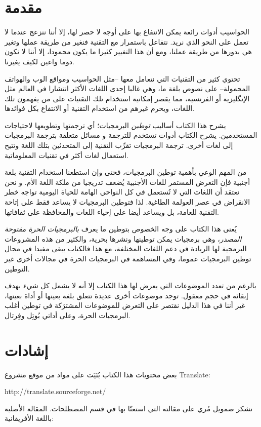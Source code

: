 \section{مقدمة}
الحواسيب أدوات رائعة يمكن الانتفاع بها على أوجه لا حصر لها، إلا أننا
ننزعج عندما لا تعمل على النحو الذي نريد. نتفاعل باستمرار مع التقنية
فنغير من طريقة عملها وتغير هي بدورها من طريقة عملنا، ومع أن هذا التغيير
كثيرا ما يكون محمودا، إلا أننا لا نكون دوما واعين لكيف يغيرنا.

تحتوي كثير من التقنيات التي نتعامل معها –مثل الحواسيب ومواقع الوب
والهواتف المحمولة– على نصوص بلغة ما، وهي غالبا إحدى اللغات الأكثر
انتشارا في العالم مثل الإنگليزية أو الفرنسية، مما يقصر إمكانية استخدام
تلك التقنيات على من يفهمون تلك اللغات، ويحرم غيرهم من استخدام التقنية
أو الانتفاع بكل فوائدها.

يشرح هذا الكتاب أساليب {\it توطين} البرمجيات؛ أي ترجمتها وتطويعها
لاحتياجات المستخدمين. يشرح الكتاب أدوات تستخدم للترجمة و مسائل متعلقة
بترجمة البرمجيات إلى لغات أخرى. ترجمة البرمجيات تقرِّب التقنية إلى
المتحدثين بتلك اللغة وتتيح استعمال لغات أكثر في تقنيات المعلوماتية.

من المهم الوعي بأهمية توطين البرمجيات، فحتى وإن استطعنا استخدام التقنية
بلغة أجنبية فإن التعرض المستمر للغات الأجنبية يُضعف تدريجيا من ملكة
اللغة الأم. و نحن نعتقد أن اللغات التي لا تُستعمل في كل النواحي الهامة
للحياة اليومية تواجه خطر الانقراض في عصر العولمة الطاغية. لذا فتوطين
البرمجيات لا يساعد فقط على إتاحة التقنية للعامة، بل ويساعد أيضا على
إحياء اللغات والمحافظة على ثقافاتها.

يُعنى هذا الكتاب على وجه الخصوص بتوطين ما يعرف {\it بالبرمجيات الحرة
مفتوحة المصدر}، وهي برمجيات يمكن توطينها ونشرها بحرية، والكثير من هذه
المشروعات البرمجية لها الريادة في دعم اللغات المختلفة، مع هذا فالكتاب
يبقى مفيدا في مجال توطين البرمجيات عموما، وفي المساهمة في البرمجيات
الحرة في مجالات أخرى غير التوطين.

بالرغم من تعدد الموضوعات التي يعرض لها هذا الكتاب إلا أنه لا يشمل كل شيء
بهدف إبقائه في حجم معقول. توجد موضوعات أخرى عديدة تتعلق بلغة بعينها أو
أداة بعينها، غير أننا في هذا الدليل نقتصر على التعرض للموضوعات
المشترَكة في توطين أغلب البرمجيات الحرة، وعلى أداتي بُوتِل وفِرتال.

\section{إشادات}
بعض محتويات هذا الكتاب بُنَيَت على مواد من موقع مشروع Translate:

http://translate.sourceforge.net/

نشكر صمويل مُري على مقالته التي استعنّا بها في قسم المصطلحات. المقالة
الأصلية باللغة الأفريقانية:

